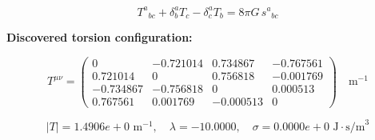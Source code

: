 
\begin{equation}
  T^a{}_{bc} + \delta^a_b T_c - \delta^a_c T_b = 8\pi G \, s^a{}_{bc}
\end{equation}

\textbf{Discovered torsion configuration:}

\begin{equation}
  T^{\mu\nu} = \begin{pmatrix}
    0 & -0.721014 & 0.734867 & -0.767561 \\
    0.721014 & 0 & 0.756818 & -0.001769 \\
    -0.734867 & -0.756818 & 0 & 0.000513 \\
    0.767561 & 0.001769 & -0.000513 & 0
  \end{pmatrix} \quad \text{m}^{-1}
\end{equation}

\begin{equation}
  |T| = 1.4906e+0 \text{ m}^{-1}, \quad
  \lambda = -10.0000, \quad
  \sigma = 0.0000e+0 \text{ J}\cdot\text{s/m}^3
\end{equation}